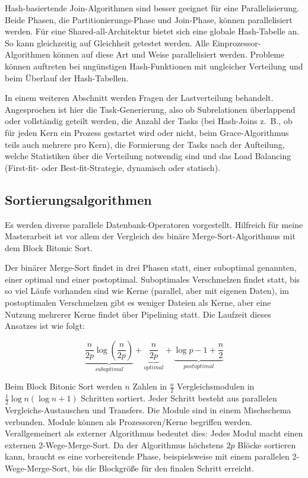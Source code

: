 \documentclass[a4paper,12pt,twoside]{article}
\begin{document}
Hash-basiertende Join-Algorithmen sind besser geeignet für eine Parallelisierung. Beide Phasen, die Partitionierungs-Phase und Join-Phase, können parallelisiert werden. Für eine Shared-all-Architektur bietet sich eine globale Hash-Tabelle an. So kann gleichzeitig auf Gleichheit getestet werden. Alle Einprozessor-Algorithmen können auf diese Art und Weise parallelisiert werden. Probleme können auftreten bei ungünstigen Hash-Funktionen mit ungleicher Verteilung und beim Überlauf der Hash-Tabellen.

In einem weiteren Abschnitt werden Fragen der Lastverteilung behandelt. Angesprochen ist hier die Task-Generierung, also ob Subrelationen überlappend oder vollständig geteilt werden, die Anzahl der Tasks (bei Hash-Joins z.~B., ob für jeden Kern ein Prozess gestartet wird oder nicht, beim Grace-Algorithmus teils auch mehrere pro Kern), die Formierung der Tasks nach der Aufteilung, welche Statistiken über die Verteilung notwendig sind und das Load Balancing (First-fit- oder Best-fit-Strategie, dynamisch oder statisch). 

\subsection{Sortierungsalgorithmen}

\textbf{}

Es werden diverse parallele Datenbank-Operatoren vorgestellt. Hilfreich für meine Masterarbeit ist vor allem der Vergleich des binäre Merge-Sort-Algorithmus mit dem Block Bitonic Sort.

Der binärer Merge-Sort findet in drei Phasen statt, einer suboptimal genannten, einer optimal und einer postoptimal. Suboptimales Verschmelzen findet statt, bis so viel Läufe vorhanden sind wie Kerne (parallel, aber mit eigenen Daten), im postoptimalen Verschmelzen gibt es weniger Dateien als Kerne, aber eine Nutzung mehrerer Kerne findet über Pipelining statt. Die Laufzeit dieses Ansatzes ist wie folgt:

\[ \underbrace{\frac{n}{2p} \log \left( \frac{n}{2p} \right)}_{suboptimal} + \underbrace{\frac{n}{2p}}_{optimal} + \underbrace{\log p - 1 + \frac{n}{2}}_{postoptimal} \]

Beim Block Bitonic Sort werden $n$ Zahlen in $\frac{n}{2}$ Vergleichsmodulen in $\frac{1}{2} \log n (\log n +1)$ Schritten sortiert. Jeder Schritt besteht aus parallelen Vergleichs-Austauschen und Transfers. Die  Module sind in einem Mischschema verbunden. Module können als Prozessoren/Kerne begriffen werden. Verallgemeinert als externer Algorithmus bedeutet dies: Jedes Modul macht einen externen 2-Wege-Merge-Sort. Da der Algorithmus höchstens $2p$ Blöcke sortieren kann, braucht es eine vorbereitende Phase, beispielsweise mit einem parallelen 2-Wege-Merge-Sort, bis die Blockgröße für den finalen Schritt erreicht.
\end{document}
